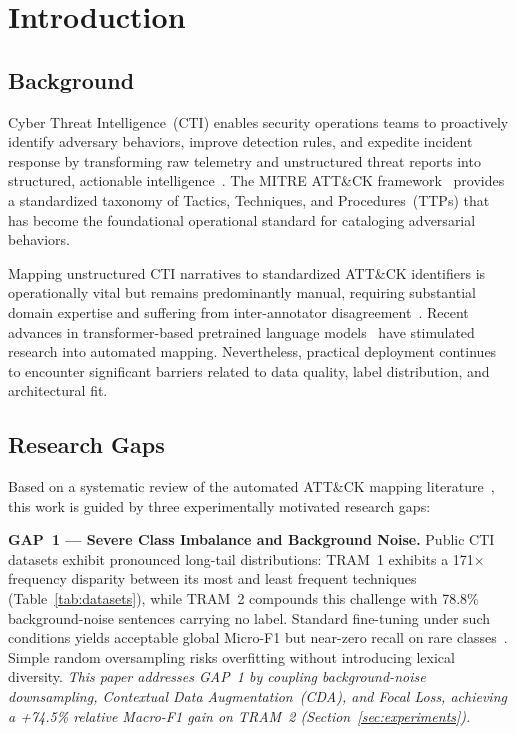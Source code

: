 \documentclass[runningheads]{llncs}
\begin{document}
\section{Introduction}

\subsection{Background}
Cyber Threat Intelligence~(CTI) enables security operations teams to proactively identify adversary behaviors, improve detection rules, and expedite incident response by transforming raw telemetry and unstructured threat reports into structured, actionable intelligence~\cite{sun2023cti}. The MITRE ATT\&CK framework~\cite{strom2018attack} provides a standardized taxonomy of Tactics, Techniques, and Procedures~(TTPs) that has become the foundational operational standard for cataloging adversarial behaviors.

Mapping unstructured CTI narratives to standardized ATT\&CK identifiers is operationally vital but remains predominantly manual, requiring substantial domain expertise and suffering from inter-annotator disagreement~\cite{li2024automated}. Recent advances in transformer-based pretrained language models~\cite{devlin2019bert} have stimulated research into automated mapping. Nevertheless, practical deployment continues to encounter significant barriers related to data quality, label distribution, and architectural fit.

\subsection{Research Gaps}
Based on a systematic review of the automated ATT\&CK mapping literature~\cite{li2024automated,orbinato2022automatic,albarrak2025acmapper,kim2022ttp}, this work is guided by three experimentally motivated research gaps:

\textbf{GAP~1 --- Severe Class Imbalance and Background Noise.} Public CTI datasets exhibit pronounced long-tail distributions: TRAM~1 exhibits a 171$\times$ frequency disparity between its most and least frequent techniques (Table~\ref{tab:datasets}), while TRAM~2 compounds this challenge with 78.8\% background-noise sentences carrying no label. Standard fine-tuning under such conditions yields acceptable global Micro-F1 but near-zero recall on rare classes~\cite{kim2022ttp,albarrak2025acmapper}. Simple random oversampling risks overfitting without introducing lexical diversity. \emph{This paper addresses GAP~1 by coupling background-noise downsampling, Contextual Data Augmentation~(CDA), and Focal Loss, achieving a +74.5\% relative Macro-F1 gain on TRAM~2 (Section~\ref{sec:experiments}).}
\end{document}
